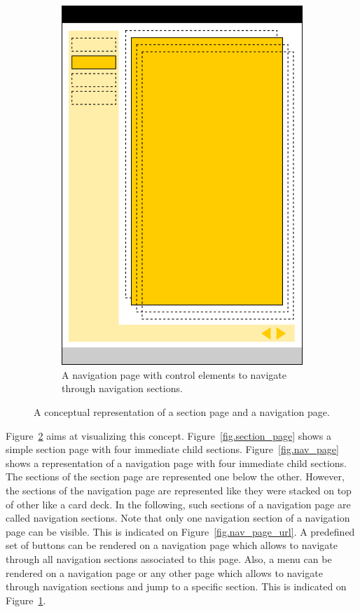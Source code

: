 \documentclass[a4paper,oneside]{book}
\begin{document}
\begin{figure}[ht]
\begin{subfigure}[t]{0.22\textwidth}
        \includegraphics[width=\textwidth]{nav_page_menu.png}
        \caption{A navigation page with control elements to navigate through navigation sections.}
        \label{fig.nav_page_menu}
    \end{subfigure}
    \caption{A conceptual representation of a section page and a navigation page.}
    \label{fig.page_types}
\end{figure}

Figure~\ref{fig.page_types} aims at visualizing this concept.
Figure~\ref{fig.section_page} shows a simple section page with four immediate child sections.
Figure~\ref{fig.nav_page} shows a representation of a navigation page with four immediate child sections.
The sections of the section page are represented one below the other.
However, the sections of the navigation page are represented like they were stacked on top of other like a card deck.
In the following, such sections of a navigation page are called navigation sections.
Note that only one navigation section of a navigation page can be visible.
This is indicated on Figure~\ref{fig.nav_page_url}.
A predefined set of buttons can be rendered on a navigation page which allows to navigate through all navigation sections associated to this page.
Also, a menu can be rendered on a navigation page or any other page which allows to navigate through navigation sections and jump to a specific section.
This is indicated on Figure~\ref{fig.nav_page_menu}.
\end{document}
